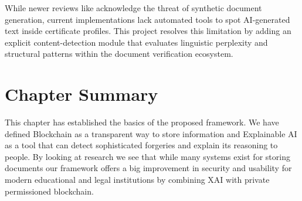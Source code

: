While newer reviews like \cite{wiputra2024harnessing} acknowledge the threat of synthetic document generation, current implementations lack automated tools to spot AI-generated text inside certificate profiles. This project resolves this limitation by adding an explicit content-detection module that evaluates linguistic perplexity and structural patterns within the document verification ecosystem.













\section{Chapter Summary}
This chapter has established the basics of the proposed framework. We have defined Blockchain as a transparent way to store information and Explainable AI as a tool that can detect sophisticated forgeries and explain its reasoning to people. By looking at research we see that while many systems exist for storing documents our framework offers a big improvement in security and usability for modern educational and legal institutions by combining XAI with private permissioned blockchain.